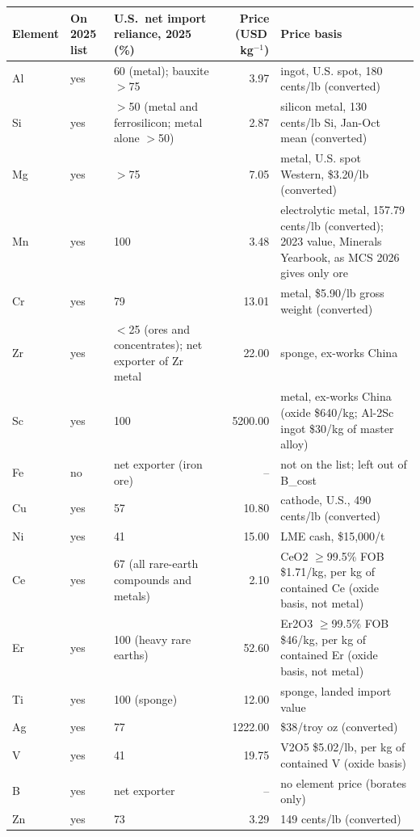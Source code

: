 \begin{tabular}{@{}lllrl@{}}
\toprule
Element & On 2025 list & U.S.\ net import reliance, 2025 (\%) & Price (USD\,kg$^{-1}$) & Price basis \\
\midrule
Al & yes & 60 (metal); bauxite $>$75 & 3.97 & ingot, U.S. spot, 180 cents/lb (converted) \\
Si & yes & $>$50 (metal and ferrosilicon; metal alone $>$50) & 2.87 & silicon metal, 130 cents/lb Si, Jan-Oct mean (converted) \\
Mg & yes & $>$75 & 7.05 & metal, U.S. spot Western, \$3.20/lb (converted) \\
Mn & yes & 100 & 3.48 & electrolytic metal, 157.79 cents/lb (converted); 2023 value, Minerals Yearbook, as MCS 2026 gives only ore \\
Cr & yes & 79 & 13.01 & metal, \$5.90/lb gross weight (converted) \\
Zr & yes & $<$25 (ores and concentrates); net exporter of Zr metal & 22.00 & sponge, ex-works China \\
Sc & yes & 100 & 5200.00 & metal, ex-works China (oxide \$640/kg; Al-2Sc ingot \$30/kg of master alloy) \\
Fe & no & net exporter (iron ore) & -- & not on the list; left out of B\_cost \\
Cu & yes & 57 & 10.80 & cathode, U.S., 490 cents/lb (converted) \\
Ni & yes & 41 & 15.00 & LME cash, \$15,000/t \\
Ce & yes & 67 (all rare-earth compounds and metals) & 2.10 & CeO2 $\geq$99.5\% FOB \$1.71/kg, per kg of contained Ce (oxide basis, not metal) \\
Er & yes & 100 (heavy rare earths) & 52.60 & Er2O3 $\geq$99.5\% FOB \$46/kg, per kg of contained Er (oxide basis, not metal) \\
Ti & yes & 100 (sponge) & 12.00 & sponge, landed import value \\
Ag & yes & 77 & 1222.00 & \$38/troy oz (converted) \\
V & yes & 41 & 19.75 & V2O5 \$5.02/lb, per kg of contained V (oxide basis) \\
B & yes & net exporter & -- & no element price (borates only) \\
Zn & yes & 73 & 3.29 & 149 cents/lb (converted) \\
\bottomrule
\end{tabular}
